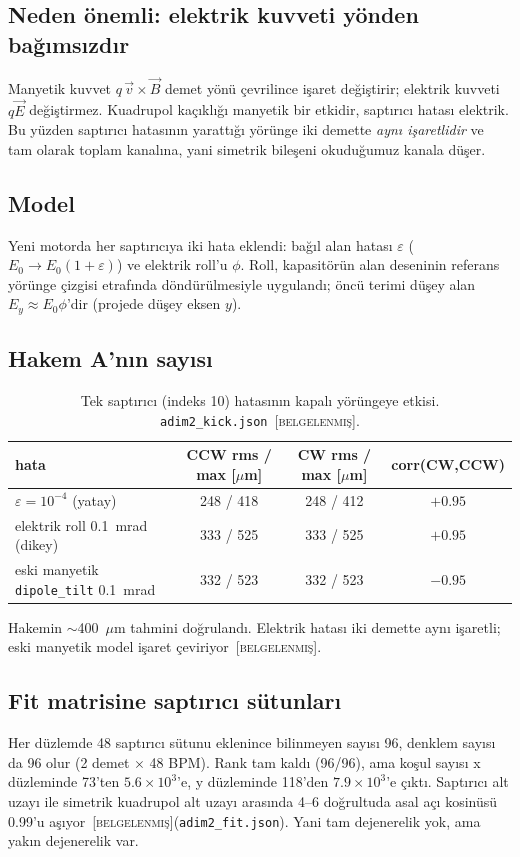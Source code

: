 \documentclass[11pt,a4paper]{article}
\newcommand{\kod}[1]{{\XeTeXinterchartokenstate=0\texttt{#1}}}
\newcommand{\BEL}{\textsc{[belgelenmiş]}}
\begin{document}
\subsection{Neden önemli: elektrik kuvveti yönden bağımsızdır}
Manyetik kuvvet $q\,\vec v\times\vec B$ demet yönü çevrilince işaret değiştirir; elektrik kuvveti
$q\vec E$ değiştirmez. Kuadrupol kaçıklığı manyetik bir etkidir, saptırıcı hatası elektrik. Bu yüzden
saptırıcı hatasının yarattığı yörünge iki demette \emph{aynı işaretlidir} ve tam olarak toplam kanalına,
yani simetrik bileşeni okuduğumuz kanala düşer.

\subsection{Model}
Yeni motorda her saptırıcıya iki hata eklendi: bağıl alan hatası $\varepsilon$ ($E_0\to E_0(1+\varepsilon)$)
ve elektrik roll'u $\phi$. Roll, kapasitörün alan deseninin referans yörünge çizgisi etrafında
döndürülmesiyle uygulandı; öncü terimi düşey alan $E_y\approx E_0\phi$'dir (projede düşey eksen $y$).

\subsection{Hakem A'nın sayısı}
\begin{table}[H]\centering\small
\caption{Tek saptırıcı (indeks 10) hatasının kapalı yörüngeye etkisi. \kod{adim2\_kick.json}~\BEL.}
\begin{tabular}{lccc}
\toprule
hata & CCW rms / max [$\mu$m] & CW rms / max [$\mu$m] & corr(CW,CCW) \\
\midrule
$\varepsilon=10^{-4}$ (yatay) & 248 / 418 & 248 / 412 & $+0.95$ \\
elektrik roll 0.1~mrad (dikey) & 333 / 525 & 333 / 525 & $+0.95$ \\
eski manyetik \kod{dipole\_tilt} 0.1~mrad & 332 / 523 & 332 / 523 & $-0.95$ \\
\bottomrule
\end{tabular}
\end{table}
Hakemin $\sim$400~$\mu$m tahmini doğrulandı. Elektrik hatası iki demette aynı işaretli; eski manyetik
model işaret çeviriyor~\BEL.

\subsection{Fit matrisine saptırıcı sütunları}
Her düzlemde 48 saptırıcı sütunu eklenince bilinmeyen sayısı 96, denklem sayısı da 96 olur (2 demet
$\times$ 48 BPM). Rank tam kaldı (96/96), ama koşul sayısı x düzleminde 73'ten $5.6\times10^{3}$'e, y
düzleminde 118'den $7.9\times10^{3}$'e çıktı. Saptırıcı alt uzayı ile simetrik kuadrupol alt uzayı
arasında 4--6 doğrultuda asal açı kosinüsü 0.99'u aşıyor~\BEL (\kod{adim2\_fit.json}). Yani tam
dejenerelik yok, ama yakın dejenerelik var.
\end{document}
